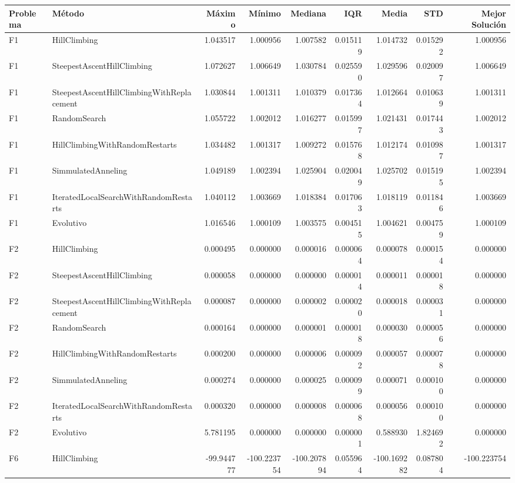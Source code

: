 \begin{tabular}{llrrrrrrr}
\toprule
Problema & Método & Máximo & Mínimo & Mediana & IQR & Media & STD & Mejor Solución \\
\midrule
F1 & HillClimbing & 1.043517 & 1.000956 & 1.007582 & 0.015119 & 1.014732 & 0.015292 & 1.000956 \\
F1 & SteepestAscentHillClimbing & 1.072627 & 1.006649 & 1.030784 & 0.025590 & 1.029596 & 0.020097 & 1.006649 \\
F1 & SteepestAscentHillClimbingWithReplacement & 1.030844 & 1.001311 & 1.010379 & 0.017364 & 1.012664 & 0.010639 & 1.001311 \\
F1 & RandomSearch & 1.055722 & 1.002012 & 1.016277 & 0.015997 & 1.021431 & 0.017443 & 1.002012 \\
F1 & HillClimbingWithRandomRestarts & 1.034482 & 1.001317 & 1.009272 & 0.015768 & 1.012174 & 0.010987 & 1.001317 \\
F1 & SimmulatedAnneling & 1.049189 & 1.002394 & 1.025904 & 0.020049 & 1.025702 & 0.015195 & 1.002394 \\
F1 & IteratedLocalSearchWithRandomRestarts & 1.040112 & 1.003669 & 1.018384 & 0.017063 & 1.018119 & 0.011846 & 1.003669 \\
F1 & Evolutivo & 1.016546 & 1.000109 & 1.003575 & 0.004515 & 1.004621 & 0.004759 & 1.000109 \\
F2 & HillClimbing & 0.000495 & 0.000000 & 0.000016 & 0.000064 & 0.000078 & 0.000154 & 0.000000 \\
F2 & SteepestAscentHillClimbing & 0.000058 & 0.000000 & 0.000000 & 0.000014 & 0.000011 & 0.000018 & 0.000000 \\
F2 & SteepestAscentHillClimbingWithReplacement & 0.000087 & 0.000000 & 0.000002 & 0.000020 & 0.000018 & 0.000031 & 0.000000 \\
F2 & RandomSearch & 0.000164 & 0.000000 & 0.000001 & 0.000018 & 0.000030 & 0.000056 & 0.000000 \\
F2 & HillClimbingWithRandomRestarts & 0.000200 & 0.000000 & 0.000006 & 0.000092 & 0.000057 & 0.000078 & 0.000000 \\
F2 & SimmulatedAnneling & 0.000274 & 0.000000 & 0.000025 & 0.000099 & 0.000071 & 0.000100 & 0.000000 \\
F2 & IteratedLocalSearchWithRandomRestarts & 0.000320 & 0.000000 & 0.000008 & 0.000068 & 0.000056 & 0.000100 & 0.000000 \\
F2 & Evolutivo & 5.781195 & 0.000000 & 0.000000 & 0.000001 & 0.588930 & 1.824692 & 0.000000 \\
F6 & HillClimbing & -99.944777 & -100.223754 & -100.207894 & 0.055964 & -100.169282 & 0.087804 & -100.223754 \\

\end{tabular}
